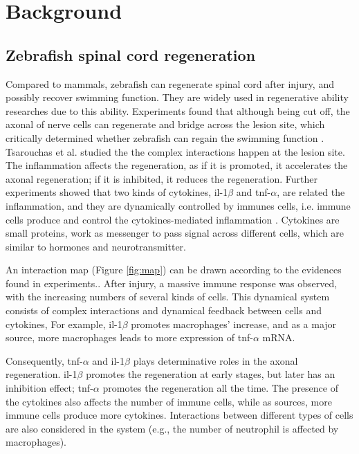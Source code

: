 \chapter{Background}

\section{Zebrafish spinal cord regeneration}


Compared to mammals, zebrafish can regenerate spinal cord after injury, and possibly recover swimming function. They are widely used in regenerative ability researches due to this ability. Experiments found that although being cut off, the axonal of nerve cells can regenerate and bridge across the lesion site, which critically determined whether zebrafish can regain the swimming function \cite{axonal}. Tsarouchas et al.\cite{ref:Tsarouchas} studied the the complex interactions happen at the lesion site. The inflammation affects the regeneration, as if it is promoted, it accelerates the axonal regeneration; if it is inhibited, it reduces the regeneration\cite{ref:Tsarouchas}. Further experiments showed that two kinds of cytokines, il-1$\beta$ and tnf-$\alpha$, are related the inflammation, and they are dynamically controlled by immunes cells, i.e. immune cells produce and control the cytokines-mediated inflammation \cite{ref:Tsarouchas}. Cytokines are small proteins, work as messenger to pass signal across different cells, which are similar to hormones and neurotransmitter.

An interaction map (Figure \ref{fig:map}) can be drawn according to the evidences found in experiments.\cite{ref:Tsarouchas}. After injury, a massive immune response was observed, with the increasing numbers of several kinds of cells. This dynamical system consists of complex interactions and dynamical feedback between cells and cytokines, For example, il-1$\beta$ promotes macrophages' increase, and as a major source, more macrophages leads to more expression of tnf-$\alpha$ mRNA. 

Consequently, tnf-$\alpha$ and il-1$\beta$ plays determinative roles in the axonal regeneration. il-1$\beta$ promotes the regeneration at early stages, but later has an inhibition effect; tnf-$\alpha$ promotes the regeneration all the time. The presence of the cytokines also affects the number of immune cells, while as sources, more immune cells produce more cytokines. Interactions between different types of cells are also considered in the system (e.g., the number of neutrophil is affected by macrophages).


